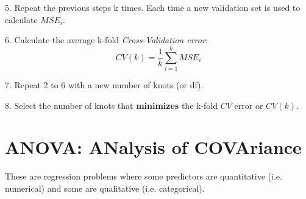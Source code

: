\documentclass[11pt,a4paper]{article}
\begin{document}
5. Repeat the previous steps k times. Each time a new validation set is used to calculate ${MSE}_i$.

6. Calculate the average k-fold \textit{Cross-Validation error}: $${CV}(k) = \frac{1}{k} \sum_{i=1}^{k}{MSE}_i$$

7. Repeat 2 to 6 with a new number of knots (or df).

8. Select the number of knots that \textbf{minimizes} the k-fold ${CV}$ error or ${CV}(k)$.







\section{ANOVA: ANalysis of COVAriance}
These are regression problems where some predictors are quantitative (i.e. numerical) and some are qualitative (i.e. categorical).
\end{document}
